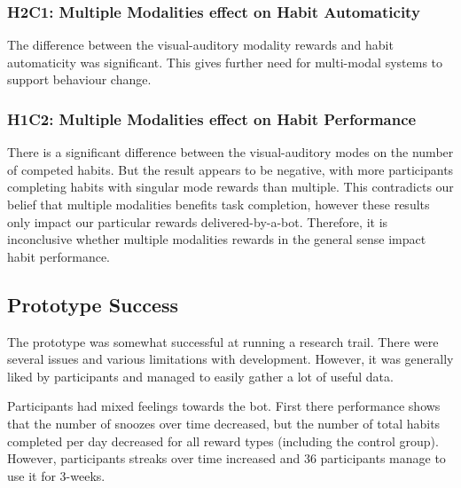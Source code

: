 \documentclass{scaffold/sigchi}
\begin{document}
\subsubsection{H2C1: Multiple Modalities effect on Habit Automaticity}
The difference between the visual-auditory modality rewards and habit automaticity was significant. This gives further need for multi-modal systems to support behaviour change.

\subsubsection{H1C2: Multiple Modalities effect on Habit Performance}
There is a significant difference between the visual-auditory modes on the number of competed habits. But the result appears to be negative, with more participants completing habits with singular mode rewards than multiple. This contradicts our belief that multiple modalities benefits task completion, however these results only impact our particular rewards delivered-by-a-bot. Therefore, it is inconclusive whether multiple modalities rewards in the general sense impact habit performance.










\subsection{Prototype Success}
The prototype was somewhat successful at running a research trail. There were several issues and various limitations with development. However, it was generally liked by participants and managed to easily gather a lot of useful data.

Participants had mixed feelings towards the bot. First there performance shows that the number of snoozes over time decreased, but the number of total habits completed per day decreased for all reward types (including the control group). However, participants streaks over time increased and 36 participants manage to use it for 3-weeks.
\end{document}
